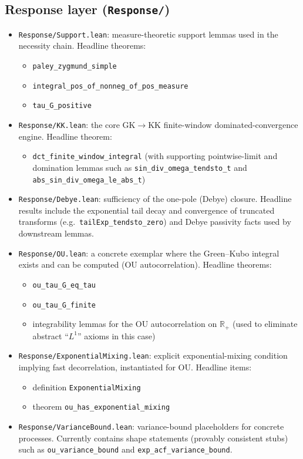 \documentclass[11pt]{article}
\begin{document}
\subsection{Response layer (\texttt{Response/})}
\begin{itemize}
\item \texttt{Response/Support.lean}: measure-theoretic support lemmas used in the necessity chain.
Headline theorems:
\begin{itemize}
\item \texttt{paley\_zygmund\_simple}
\item \texttt{integral\_pos\_of\_nonneg\_of\_pos\_measure}
\item \texttt{tau\_G\_positive}
\end{itemize}

\item \texttt{Response/KK.lean}: the core GK$\to$KK finite-window dominated-convergence engine.
Headline theorem:
\begin{itemize}
\item \texttt{dct\_finite\_window\_integral} (with supporting pointwise-limit and domination lemmas such as \texttt{sin\_div\_omega\_tendsto\_t} and \texttt{abs\_sin\_div\_omega\_le\_abs\_t})
\end{itemize}

\item \texttt{Response/Debye.lean}: sufficiency of the one-pole (Debye) closure.
Headline results include the exponential tail decay and convergence of truncated transforms (e.g.\ \texttt{tailExp\_tendsto\_zero}) and Debye passivity facts used by downstream lemmas.

\item \texttt{Response/OU.lean}: a concrete exemplar where the Green--Kubo integral exists and can be computed (OU autocorrelation).
Headline theorems:
\begin{itemize}
\item \texttt{ou\_tau\_G\_eq\_tau}
\item \texttt{ou\_tau\_G\_finite}
\item integrability lemmas for the OU autocorrelation on $\mathbb{R}_+$ (used to eliminate abstract ``$L^1$'' axioms in this case)
\end{itemize}

\item \texttt{Response/ExponentialMixing.lean}: explicit exponential-mixing condition implying fast decorrelation, instantiated for OU.
Headline items:
\begin{itemize}
\item definition \texttt{ExponentialMixing}
\item theorem \texttt{ou\_has\_exponential\_mixing}
\end{itemize}

\item \texttt{Response/VarianceBound.lean}: variance-bound placeholders for concrete processes.
Currently contains shape statements (provably consistent stubs) such as \texttt{ou\_variance\_bound} and \texttt{exp\_acf\_variance\_bound}.
\end{itemize}
\end{document}
